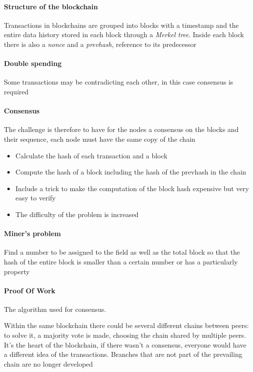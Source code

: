 \paragraph{Structure of the blockchain}
Transactions in blockchains are grouped into blocks with a timestamp and the entire data history stored in each block through a \textit{Merkel tree}. Inside each block there is also a \textit{nonce} and a \textit{prevhash}, reference to its predecessor

\paragraph{Double spending}
Some transactions may be contradicting each other, in this case consensus is required

\paragraph{Consensus}
The challenge is therefore to have for the nodes a consensus on the blocks and their sequence, each node must have the same copy of the chain
\begin{itemize}
    \item Calculate the hash of each transaction and a block
    \item Compute the hash of a block including the hash of the prevhash in the chain
    \item Include a trick to make the computation of the block hash expensive but very easy to verify
    \item The difficulty of the problem is increased 
\end{itemize}

\paragraph{Miner's problem}
Find a number to be assigned to the field as well as the total block so that the hash of the entire block is smaller than a certain number or has a particularly property

\paragraph{Proof Of Work}
The algorithm used for consensus. 

Within the same blockchain there could be several different chains between peers: to solve it, a majority vote is made, choosing the chain shared by multiple peers. It’s the heart of the blockchain, if there wasn’t a consensus, everyone would have a different idea of the transactions. Branches that are not part of the prevailing chain are no longer developed

